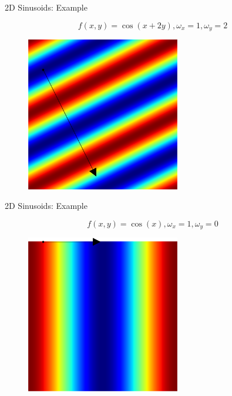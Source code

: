 \documentclass{beamer}
\begin{document}
\begin{frame}{2D Sinusoids: Example}

\[ f(x, y) = \cos( x + 2y ), \omega_x = 1, \omega_y = 2 \]

\begin{figure}[t]
    \includegraphics[width=0.6\textwidth]{2DPlaneWaves/1_2.png}
\end{figure}

\end{frame}



\begin{frame}{2D Sinusoids: Example}

\[ f(x, y) = \cos( x ), \omega_x = 1, \omega_y = 0 \]

\begin{figure}[t]
    \includegraphics[width=0.6\textwidth]{2DPlaneWaves/1_0.png}
\end{figure}

\end{frame}
\end{document}
